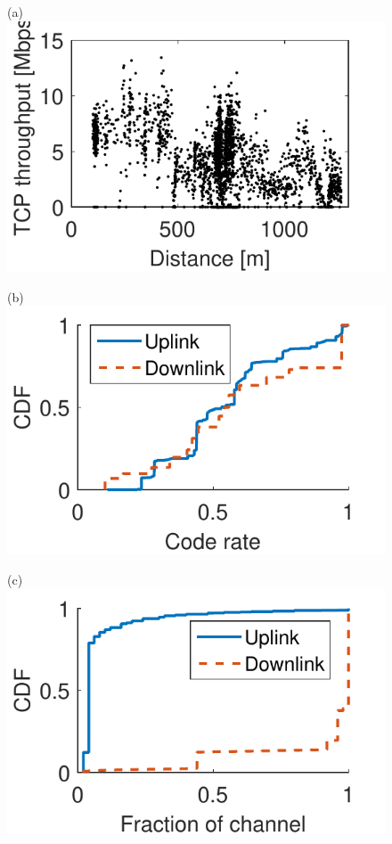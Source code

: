 \begin{figure}[t]
  \begin{minipage}{0.32\textwidth}
    \centering
    (a)
    \vskip -2.5pt
    \includegraphics[width=\textwidth]{./figs/range.pdf}
  \end{minipage}
  \begin{minipage}{0.32\textwidth}
    \centering
    (b)
    \vskip -2.5pt
    \includegraphics[width=\textwidth]{./figs/coding_rate.pdf}
  \end{minipage}
  \begin{minipage}{0.32\textwidth}
    \centering
    (c)
    \vskip -2.5pt
    \includegraphics[width=\textwidth]{./figs/NRB.pdf}

\end{minipage}
\end{figure}
